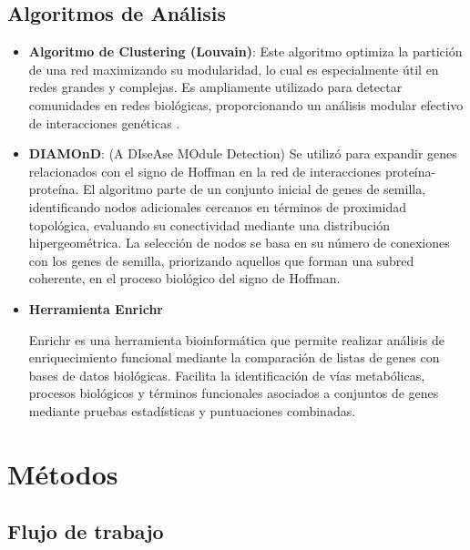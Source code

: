 \subsection{Algoritmos de Análisis}


\begin{itemize}
	\item \textbf{Algoritmo de Clustering (Louvain)}: Este algoritmo optimiza la partición de una red maximizando su modularidad, lo cual es especialmente útil en redes grandes y complejas. Es ampliamente utilizado para detectar comunidades en redes biológicas, proporcionando un análisis modular efectivo de interacciones genéticas \cite{Blondel2008}.
	
	\item \textbf{DIAMOnD}: (A DIseAse MOdule Detection) Se utilizó para expandir genes relacionados con el signo de Hoffman en la red de interacciones proteína-proteína. El algoritmo parte de un conjunto inicial de genes de semilla, identificando nodos adicionales cercanos en términos de proximidad topológica, evaluando su conectividad mediante una distribución hipergeométrica. La selección de nodos se basa en su número de conexiones con los genes de semilla, priorizando aquellos que forman una subred coherente, en el proceso biológico del signo de Hoffman.\cite{Ghiassian2015}
	
	
	
	

	\item \textbf{Herramienta Enrichr}
	
	Enrichr es una herramienta bioinformática que permite realizar análisis de enriquecimiento funcional mediante la comparación de listas de genes con bases de datos biológicas. Facilita la identificación de vías metabólicas, procesos biológicos y términos funcionales asociados a conjuntos de genes mediante pruebas estadísticas y puntuaciones combinadas.\cite{10.1093/nar/gkad393/1}
	
	
\end{itemize}



\section{Métodos}

\subsection{Flujo de trabajo}

